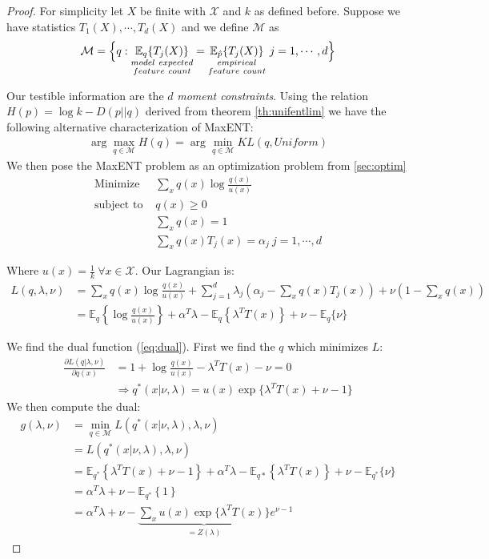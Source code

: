 \documentclass[]{article}
\theoremstyle{mattstyle}
\theoremstyle{definition}
\begin{document}
\begin{proof}
For simplicity let $X$ be finite with $\mathcal{X}$ and $k$ as defined before. Suppose we have statistics $T_1(X), \cdots, T_d(X)$ and we define $\mathcal{M}$ as
\begin{equation}
\mathcal{M} = \Bigl\{ q: \underset{\substack{model \ expected \\ feature \ count}}{\mathbb{E}_{q}\{T_j(X)\}} = \underset{\substack{empirical \\ feature \ count}}{\mathbb{E}_{\hat{p}}\{T_j(X)\}} \ j = 1,\cdots,d \Bigr\}
\end{equation}

Our testible information are the $d$ \emph{moment constraints}. Using the relation \(H(p)=\log k-D(p||q)\) derived from theorem \ref{th:unifentlim} we have the following alternative characterization of MaxENT:
\begin{align}
\arg\max\limits_{q \in \mathcal{M}} H(q) = \arg\min\limits_{q \in \mathcal{M}} KL(q, Uniform)
\end{align}
We then pose the MaxENT problem as an optimization problem from \ref{sec:optim} 
\begin{align*}
\text{Minimize } & \sum_{x}q(x)\log \frac{q(x)}{u(x)} \\
\text{subject to } & q(x)\ge 0 \\
& \sum_x q(x) = 1 \\
& \sum_x q(x)T_j(x) = \alpha_j \ j = 1, \cdots, d
\end{align*}

Where $u(x) = \frac{1}{k} \ \forall x\in \mathcal{X}$. Our Lagrangian is:
\begin{align*}
L(q, \lambda, \nu) &= \sum_{x}q(x)\log \frac{q(x)}{u(x)} + \sum_{j=1}^d \lambda_j \left( \alpha_j - \sum_x q(x)T_j(x) \right) + \nu\left(1 - \sum_x q(x) \right)\\
&= \mathbb{E}_{q}\left\{ \log \frac{q(x)}{u(x)} \right\} + \alpha^T\lambda - \mathbb{E}_{q}\left\{\lambda^TT(x)\right\} + \nu - \mathbb{E}_{q}\{\nu\}
\end{align*}

We find the dual function (\ref{eq:dual}). First we find the $q$ which minimizes $L$:
\begin{align*}
\frac{\partial L(q| \lambda, \nu)}{\partial q(x)} &= 1 + \log \frac{q(x)}{u(x)} -  \lambda^TT(x) - \nu = 0\\
&\Rightarrow q^*(x| \nu, \lambda) = u(x)\exp\{ \lambda^TT(x) + \nu -1\}
\end{align*}
We then compute the dual:
\begin{align*}
g(\lambda, \nu) &=\min\limits_{q\in \mathcal{M}} L(q^*(x| \nu, \lambda),\lambda,\nu)\\
&= L(q^*(x| \nu, \lambda),\lambda,\nu)\\
&= \mathbb{E}_{q^*}\left\{ \lambda^TT(x) + \nu -1 \right\} +  \alpha^T\lambda - \mathbb{E}_{q*}\left\{\lambda^TT(x)\right\} + \nu - \mathbb{E}_{q^*}\{\nu\}\\
&=\alpha^T\lambda + \nu - \mathbb{E}_{q^*}\left\{1\right\}\\
&=\alpha^T\lambda + \nu - \underbrace{\sum_x u(x)\exp\{ \lambda^TT(x)\}}_{=Z(\lambda)}e^{\nu -1}
\end{align*}


\end{proof}
\end{document}
